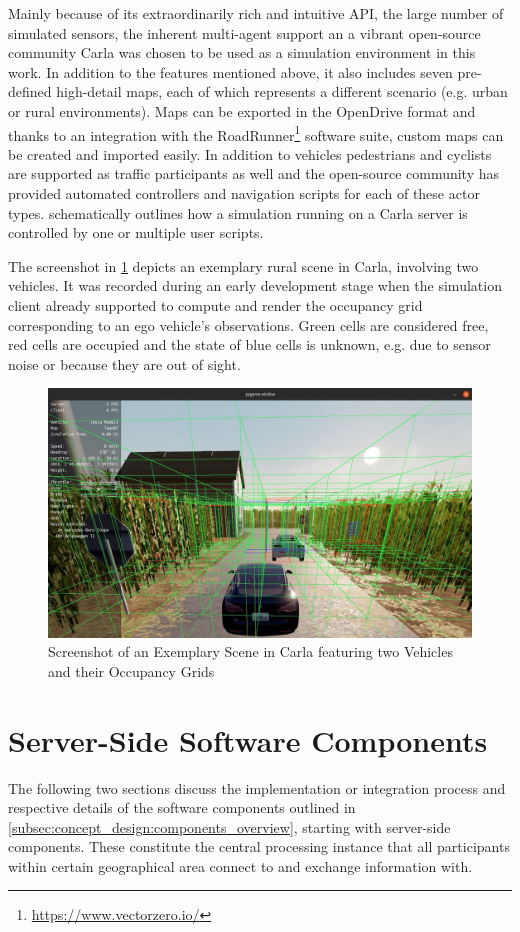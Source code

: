 Mainly because of its extraordinarily rich and intuitive API, the large number of simulated sensors, the inherent multi-agent support an a vibrant open-source community Carla was chosen to be used as a simulation environment in this work. In addition to the features mentioned above, it also includes seven pre-defined high-detail maps, each of which represents a different scenario (e.g. urban or rural environments). Maps can be exported in the OpenDrive format and thanks to an integration with the RoadRunner\footnote{\url{https://www.vectorzero.io/}} software suite, custom maps can be created and imported easily. In addition to vehicles pedestrians and cyclists are supported as traffic participants as well and the open-source community has provided automated controllers and navigation scripts for each of these actor types.  schematically outlines how a simulation running on a Carla server is controlled by one or multiple user scripts.

The screenshot in \cref{fig:carla_sceenshot_1} depicts an exemplary rural scene in Carla, involving two vehicles. It was recorded during an early development stage when the simulation client already supported to compute and render the occupancy grid corresponding to an ego vehicle's observations. Green cells are considered free, red cells are occupied and the state of blue cells is unknown, e.g. due to sensor noise or because they are out of sight.

\begin{figure}[h]
	\centering
	\includegraphics[width=0.9\linewidth]{98_images/carla_screenshot_1}
	\caption[Screenshot of an Exemplary Carla Scene]{Screenshot of an Exemplary Scene in Carla featuring two Vehicles and their Occupancy Grids}
	\label{fig:carla_sceenshot_1}
\end{figure}

\section{Server-Side Software Components}
\label{sec:implementation:server_side_software_components}
The following two sections discuss the implementation or integration process and respective details of the software components outlined in \cref{subsec:concept_design:components_overview}, starting with server-side components. These constitute the central processing instance that all participants within certain geographical area connect to and exchange information with. 

